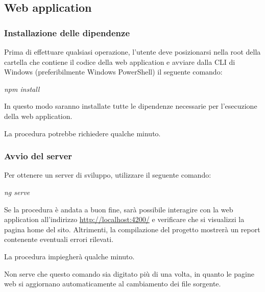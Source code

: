 \documentclass[../manuale-manutentore.tex]{subfiles}
\begin{document}
\subsection{Web application}%
\label{sub:web_application}


\subsubsection{Installazione delle dipendenze}%
\label{subs:installazione_delle_dipendenze}

Prima di effettuare qualsiasi operazione, l'utente deve posizionarsi nella root della cartella che contiene il codice della web application e avviare dalla CLI di Windows (preferibilmente Windows PowerShell) il seguente comando: \par\bigskip

\begin{center}
  \textit{npm install}
\end{center}
\par\bigskip

In questo modo saranno installate tutte le dipendenze necessarie per l'esecuzione della web application.

La procedura potrebbe richiedere qualche minuto.

\subsubsection{Avvio del server}%
\label{subs:avvio_del_server}

Per ottenere un server di sviluppo, utilizzare il seguente comando: \par\bigskip

\begin{center}
  \textit{ng serve}
\end{center}
\par\bigskip

Se la procedura è andata a buon fine, sarà possibile interagire con la web application all'indirizzo \href{http://localhost:4200/}{http://localhost:4200/} e verificare che si visualizzi la pagina home del sito.
Altrimenti, la compilazione del progetto mostrerà un report contenente eventuali errori rilevati.

La procedura impiegherà qualche minuto.

Non serve che questo comando sia digitato più di una volta, in quanto le pagine web si aggiornano automaticamente al cambiamento dei file sorgente.
\end{document}
